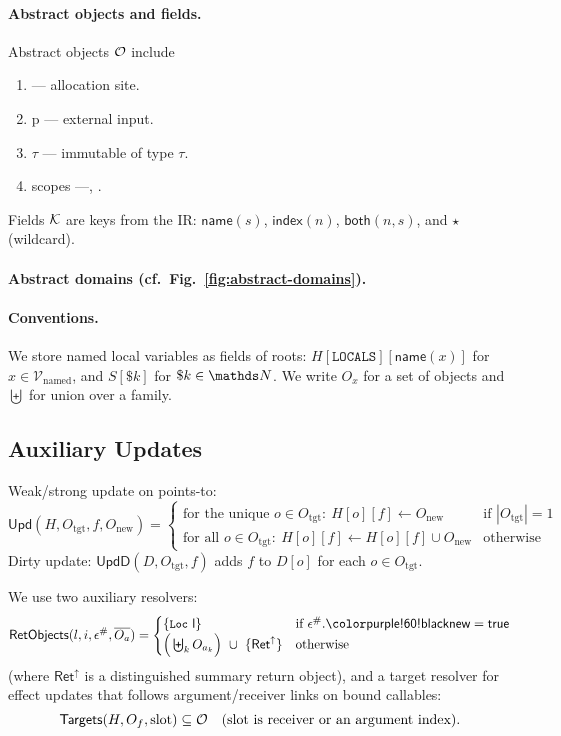 \paragraph{Abstract objects and fields.}
Abstract objects \(\mathcal{O}\) include
\begin{enumerate}
    \item {} --- allocation site.
    \item \tParam p --- external input.
    \item \tImm $\tau$ --- immutable of type $\tau$.
    \item scopes ---\tLOCALS, \tGLOBALS.
\end{enumerate}

Fields \(\mathcal{K}\) are keys from the IR:
\(\mathsf{name}(s)\), \(\mathsf{index}(n)\), \(\mathsf{both}(n,s)\), and \(\star\) (wildcard).

\paragraph{Abstract domains (cf.\ Fig.~\ref{fig:abstract-domains}).}

\paragraph{Conventions.}
We store named local variables as fields of roots:
\(H[\mathtt{LOCALS}][\mathsf{name}(x)]\) for \(x\in\mathcal{V}_{\mathrm{named}}\),
and \(S[\$k]\) for \(\$k\in\tN\).
We write \(O_x\) for a set of objects and \(\biguplus\) for union over a family.

\subsection{Auxiliary Updates}

Weak/strong update on points-to:
\[
\mathsf{Upd}(H,O_{\mathrm{tgt}},f,O_{\mathrm{new}})=
\begin{cases}
\text{for the unique }o\in O_{\mathrm{tgt}}:~H[o][f]\leftarrow O_{\mathrm{new}} & \text{if }|O_{\mathrm{tgt}}|=1\\
\text{for all }o\in O_{\mathrm{tgt}}:~H[o][f]\leftarrow H[o][f]\cup O_{\mathrm{new}} & \text{otherwise}
\end{cases}
\]
Dirty update: \(\mathsf{UpdD}(D,O_{\mathrm{tgt}},f)\) adds \(f\) to \(D[o]\) for each \(o\in O_{\mathrm{tgt}}\).

\smallskip
We use two auxiliary resolvers:
\[
\mathsf{RetObjects}(l,i,\epsilon^\#,\overline{O_a}) =
\begin{cases}
\{\loc{l}\} & \text{if }\epsilon^\#.\tnew=\mathsf{true}\\
\Big(\biguplus_k O_{a_k}\Big)\ \cup\ \{\mathsf{Ret}^\uparrow\} & \text{otherwise}
\end{cases}
\]
(where \(\mathsf{Ret}^\uparrow\) is a distinguished summary return object),
and a target resolver for effect updates that follows argument/receiver links on bound callables:
\[
\mathsf{Targets}(H, O_f, \text{slot}) \subseteq \mathcal{O}
\quad\text{(slot is receiver or an argument index)}.
\]

